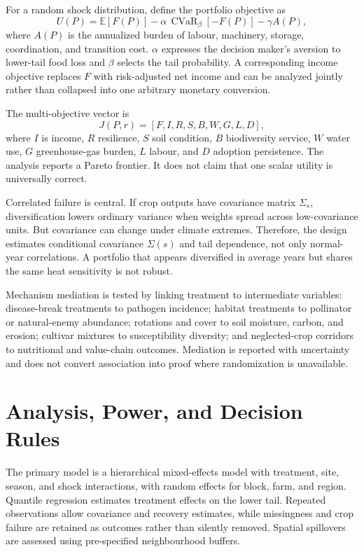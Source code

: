 \documentclass[conference]{IEEEtran}
\newcommand{\cvar}{\operatorname{CVaR}}
\begin{document}
For a random shock distribution, define the portfolio objective as
\begin{equation}
U(P)=\mathbb{E}[F(P)]-\alpha\,\cvar_{\beta}[-F(P)]-\gamma A(P),
\label{eq:utility}
\end{equation}
where $A(P)$ is the annualized burden of labour, machinery, storage, coordination, and transition cost. $\alpha$ expresses the decision maker's aversion to lower-tail food loss and $\beta$ selects the tail probability. A corresponding income objective replaces $F$ with risk-adjusted net income and can be analyzed jointly rather than collapsed into one arbitrary monetary conversion.

The multi-objective vector is
\begin{equation}
J(P,r)=[F, I, R, S, B, W, G, L, D],
\label{eq:multi}
\end{equation}
where $I$ is income, $R$ resilience, $S$ soil condition, $B$ biodiversity service, $W$ water use, $G$ greenhouse-gas burden, $L$ labour, and $D$ adoption persistence. The analysis reports a Pareto frontier. It does not claim that one scalar utility is universally correct.

Correlated failure is central. If crop outputs have covariance matrix $\Sigma_s$, diversification lowers ordinary variance when weights spread across low-covariance units. But covariance can change under climate extremes. Therefore, the design estimates conditional covariance $\Sigma(s)$ and tail dependence, not only normal-year correlations. A portfolio that appears diversified in average years but shares the same heat sensitivity is not robust.

Mechanism mediation is tested by linking treatment to intermediate variables: disease-break treatments to pathogen incidence; habitat treatments to pollinator or natural-enemy abundance; rotations and cover to soil moisture, carbon, and erosion; cultivar mixtures to susceptibility diversity; and neglected-crop corridors to nutritional and value-chain outcomes. Mediation is reported with uncertainty and does not convert association into proof where randomization is unavailable.

\section{Analysis, Power, and Decision Rules}
\label{sec:analysis}
The primary model is a hierarchical mixed-effects model with treatment, site, season, and shock interactions, with random effects for block, farm, and region. Quantile regression estimates treatment effects on the lower tail. Repeated observations allow covariance and recovery estimates, while missingness and crop failure are retained as outcomes rather than silently removed. Spatial spillovers are assessed using pre-specified neighbourhood buffers.
\end{document}
